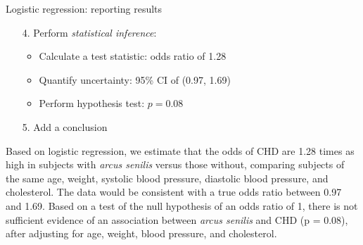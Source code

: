 \documentclass[10pt,t]{beamer}
\begin{document}
\begin{frame}{Logistic regression: reporting results}
	\begin{enumerate}
		\item[4.] Perform \textit{statistical inference}:
		\begin{itemize}
			\item Calculate a test statistic: odds ratio of 1.28
			\item Quantify uncertainty: 95\% CI of (0.97, 1.69)
			\item Perform hypothesis test: $p = 0.08$
		\end{itemize}
		\item[5.] Add a conclusion
	\end{enumerate}
	Based on logistic regression, we estimate that the odds of CHD are 1.28 times as high in subjects with \textit{arcus senilis} versus those without, comparing subjects of the same age, weight, systolic blood pressure, diastolic blood pressure, and cholesterol. The data would be consistent with a true odds ratio between 0.97 and 1.69. Based on a test of the null hypothesis of an odds ratio of 1, there is not sufficient evidence of an association between \textit{arcus senilis} and CHD (p = 0.08), after adjusting for age, weight, blood pressure, and cholesterol. 
\end{frame}
\end{document}
